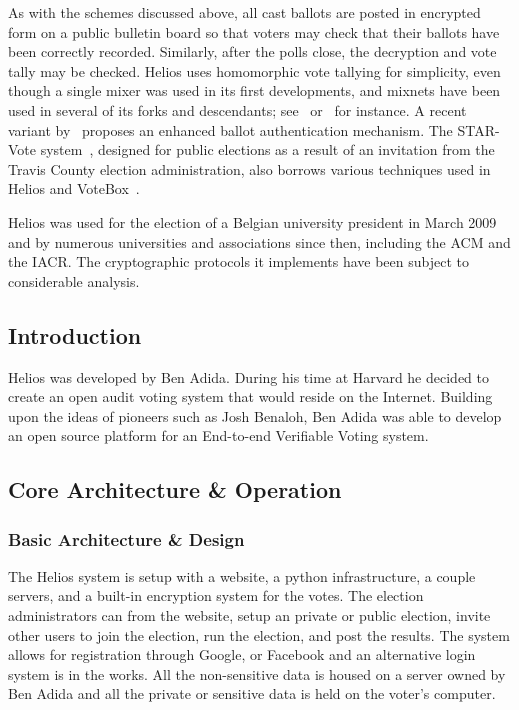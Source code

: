 As with the schemes discussed above, all cast ballots are posted in
encrypted form on a public bulletin board so that voters may check
that their ballots have been correctly recorded.  Similarly, after the
polls close, the decryption and vote tally may be checked. Helios uses
homomorphic vote tallying for simplicity, even though a single mixer
was used in its first developments, and mixnets have been used in
several of its forks and descendants; see~\cite{bulens2011}
or~\cite{tsoukalas2013} for instance. A recent variant
by~\cite{cortier2014} proposes an enhanced ballot authentication
mechanism. The STAR-Vote system~\cite{star-vote}, designed for public
elections as a result of an invitation from the Travis County election
administration, also borrows various techniques used in Helios and
VoteBox~\cite{sandler2008}.

Helios was used for the election of a Belgian university president in
March 2009 and by numerous universities and associations since then,
including the ACM and the IACR. The cryptographic protocols it
implements have been subject to considerable analysis.


\subsection{Introduction}

Helios was developed by Ben Adida. During his time at Harvard he
decided to create an open audit voting system that would reside on the
Internet. Building upon the ideas of pioneers such as Josh Benaloh,
Ben Adida was able to develop an open source platform for an
End-to-end Verifiable Voting system.

\subsection{Core Architecture \& Operation}

\subsubsection{Basic Architecture \& Design}

The Helios system is setup with a website, a python infrastructure, a
couple servers, and a built-in encryption system for the votes. The
election administrators can from the website, setup an private or
public election, invite other users to join the election, run the
election, and post the results. The system allows for registration
through Google, or Facebook and an alternative login system is in the
works. All the non-sensitive data is housed on a server owned by Ben
Adida and all the private or sensitive data is held on the voter's
computer.

